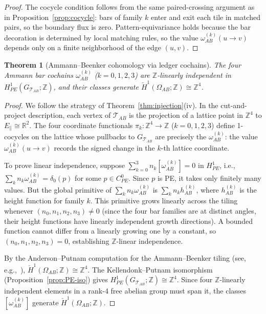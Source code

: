 \documentclass[12pt]{article}
\newtheorem{theorem}{Theorem}[section]
\theoremstyle{definition}
\theoremstyle{remark}
\newcommand{\RR}{\mathbb{R}}
\newcommand{\ZZ}{\mathbb{Z}}
\newcommand{\Hcech}{\check{H}}
\begin{document}
\begin{proof}
The cocycle condition follows from the same paired-crossing argument as in Proposition~\ref{prop:cocycle}: bars of family $k$ enter and exit each tile in matched pairs, so the boundary flux is zero. Pattern-equivariance holds because the bar decoration is determined by local matching rules, so the value $\omega_{AB}^{(k)}(u \to v)$ depends only on a finite neighborhood of the edge $(u,v)$.
\end{proof}

\begin{theorem}[Ammann--Beenker cohomology via ledger cochains]
\label{thm:AB-cohomology}
The four Ammann bar cochains $\omega_{AB}^{(k)}$ ($k = 0, 1, 2, 3$) are $\ZZ$-linearly independent in $H^1_{PE}(G_{\mathcal{T}_{AB}}; \ZZ)$, and their classes generate $\Hcech^1(\Omega_{AB}; \ZZ) \cong \ZZ^4$.
\end{theorem}

\begin{proof}
We follow the strategy of Theorem~\ref{thm:injection}(iv). In the cut-and-project description, each vertex of $\mathcal{T}_{AB}$ is the projection of a lattice point in $\ZZ^4$ to $E_\parallel \cong \RR^2$. The four coordinate functionals $\pi_k: \ZZ^4 \to \ZZ$ ($k = 0, 1, 2, 3$) define 1-cocycles on the lattice whose pullbacks to $G_{\mathcal{T}_{AB}}$ are precisely the $\omega_{AB}^{(k)}$: the value $\omega_{AB}^{(k)}(u \to v)$ records the signed change in the $k$-th lattice coordinate.

To prove linear independence, suppose $\sum_{k=0}^3 n_k [\omega_{AB}^{(k)}] = 0$ in $H^1_{PE}$, i.e., $\sum_k n_k \omega_{AB}^{(k)} = \delta_0(p)$ for some $p \in C^0_{PE}$. Since $p$ is PE, it takes only finitely many values. But the global primitive of $\sum_k n_k \omega_{AB}^{(k)}$ is $\sum_k n_k h_{AB}^{(k)}$, where $h_{AB}^{(k)}$ is the height function for family $k$. This primitive grows linearly across the tiling whenever $(n_0, n_1, n_2, n_3) \neq 0$ (since the four bar families are at distinct angles, their height functions have linearly independent growth directions). A bounded function cannot differ from a linearly growing one by a constant, so $(n_0, n_1, n_2, n_3) = 0$, establishing $\ZZ$-linear independence.

By the Anderson--Putnam computation for the Ammann--Beenker tiling (see, e.g.,~\cite{BaakeGrimm2013}), $\Hcech^1(\Omega_{AB}; \ZZ) \cong \ZZ^4$. The Kellendonk--Putnam isomorphism (Proposition~\ref{prop:PE-iso}) gives $H^1_{PE}(G_{\mathcal{T}_{AB}}; \ZZ) \cong \ZZ^4$. Since four $\ZZ$-linearly independent elements in a rank-4 free abelian group must span it, the classes $[\omega_{AB}^{(k)}]$ generate $\Hcech^1(\Omega_{AB}; \ZZ)$.
\end{proof}
\end{document}
